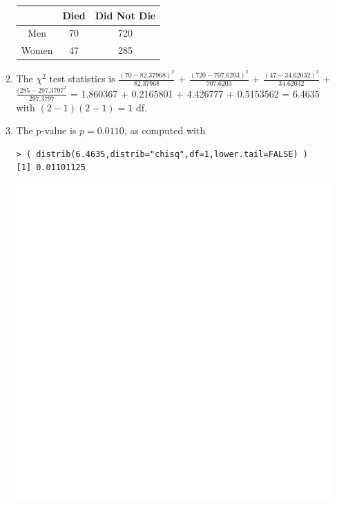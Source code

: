 \documentclass[10pt,openany]{book}\usepackage[]{graphicx}\usepackage[]{color}
\makeatletter
\newenvironment{kframe}{%
 \def\at@end@of@kframe{}%
 \ifinner\ifhmode%
  \def\at@end@of@kframe{\end{minipage}}%
  \begin{minipage}{\columnwidth}%
 \fi\fi%
 \def\FrameCommand##1{\hskip\@totalleftmargin \hskip-\fboxsep
 \colorbox{shadecolor}{##1}\hskip-\fboxsep
     \hskip-\linewidth \hskip-\@totalleftmargin \hskip\columnwidth}%
 \MakeFramed {\advance\hsize-\width
   \@totalleftmargin\z@ \linewidth\hsize
   \@setminipage}}%
 {\par\unskip\endMakeFramed%
 \at@end@of@kframe}
\newenvironment{knitrout}{}{} %
\makeatother
\begin{document}
\begin{itemize}
\begin{enumerate}
\begin{center}
\begin{tabular}{|c|c|c|}
             & Died & Did Not Die \\
            \hline
            Men & 70 & 720 \\
            \hline
            Women & 47 & 285 \\
            \hline\hline
          \end{tabular}
        \end{center}
      \item The $\chi^{2}$ test statistics is $\frac{(70-82.37968)^{2}}{82.37968}$ + $\frac{(720-707.6203)^{2}}{707.6203}$ + $\frac{(47-34.62032)^{2}}{34.62032}$ + $\frac{(285-297.3797^{2}}{297.3797}$ = 1.860367 + 0.2165801 + 4.426777 + 0.5153562 = 6.4635 with $(2-1)(2-1)=1$ df.
      \item The p-value is $p=0.0110$, as computed with
\begin{knitrout}
\color{fgcolor}\begin{kframe}
\begin{verbatim}
> ( distrib(6.4635,distrib="chisq",df=1,lower.tail=FALSE) )
[1] 0.01101125
\end{verbatim}
\end{kframe}

{\centering \includegraphics[width=.4\linewidth]{Figs/unnamed-chunk-447-1} 

}




\end{knitrout}
\end{enumerate}
\end{itemize}
\end{document}
